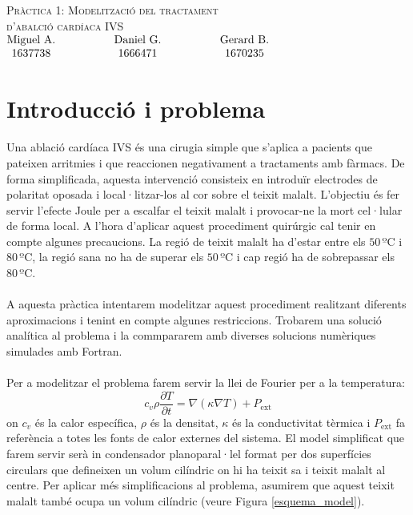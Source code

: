 \documentclass{article}
\begin{document}
\thispagestyle{empty}
\begin{center}
    {\LARGE \textsc{Pràctica 1: Modelització del tractament}}\\ 
    \vspace{0.2cm}
    {\LARGE \textsc{d'abalció cardíaca IVS}}\\ 
    \vspace{0.2cm}
    $\begin{matrix} 
    \text{Miguel A.} \hspace{1.5cm} & \text{Daniel G.} & \hspace{1.5cm} \text{Gerard B.}\\1637738 \hspace{1.5cm} & 1666471 & \hspace{1.5cm} 1670235
    \end{matrix}$
\end{center}
\section{Introducció i problema}
Una ablació cardíaca IVS és una cirugia simple que s'aplica a pacients que pateixen arritmies i que reaccionen negativament a tractaments amb fàrmacs. De forma simplificada, aquesta intervenció consisteix en introduïr electrodes de polaritat oposada i local·litzar-los al cor sobre el teixit malalt. L'objectiu és fer servir l'efecte Joule per a escalfar el teixit malalt i provocar-ne la mort cel·lular de forma local. A l'hora d'aplicar aquest procediment quirúrgic cal tenir en compte algunes precaucions. La regió de teixit malalt ha d'estar entre els \(50\,\text{ºC}\) i \(80\,\text{ºC}\), la regió sana no ha de superar els \(50\,\text{ºC}\) i cap regió ha de sobrepassar els \(80\,\text{ºC}\).\\\\
A aquesta pràctica intentarem modelitzar aquest procediment realitzant diferents aproximacions i tenint en compte algunes restriccions. Trobarem una solució analítica al problema i la commpararem amb diverses solucions numèriques simulades amb Fortran.\\\\
Per a modelitzar el problema farem servir la llei de Fourier per a la temperatura:
\begin{equation*}
    c_{v}\rho \frac{\partial T}{\partial t} = \nabla (\kappa \nabla T) + P_{\text{ext}}
\end{equation*}
on $c_{v}$ és la calor específica, $\rho$ és la densitat, $\kappa$ és la conductivitat tèrmica i $P_{\text{ext}}$ fa referència a totes les fonts de calor externes del sistema. El model simplificat que farem servir serà in condensador planoparal·lel format per dos superfícies circulars que defineixen un volum cilíndric on hi ha teixit sa i teixit malalt al centre. Per aplicar més simplificacions al problema, asumirem que aquest teixit malalt també ocupa un volum cilíndric (veure Figura \ref{esquema_model}). 
\end{document}
